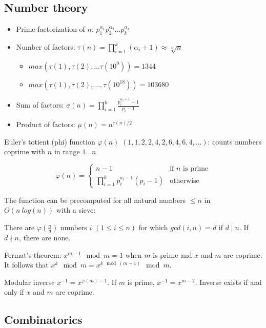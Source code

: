 \documentclass{article}
\newcommand{\divides}{\mid}
\newcommand{\notdivides}{\nmid}
\begin{document}
\subsection {Number theory}

\begin{itemize}
	\item Prime factorization of $n$: $p_1^{\alpha_1}p_2^{\alpha_2} \dots p_k^{\alpha_k}$
	\item Number of factors: $\tau(n) = \prod_{i=1}^{k} (\alpha_i+1) \approx \sqrt[3]n$
		\begin {itemize}
			\item $max(\tau(1), \tau(2), \dots \tau(10^9)) = 1344$
			\item $max(\tau(1), \tau(2), \dots, \tau(10^{18})) = 103680$
		\end {itemize}
	\item Sum of factors: $\sigma(n) = \prod_{i=1}^{k} \frac{p_i^{\alpha_i+1}-1}{p_i-1}$
	\item Product of factors: $\mu(n) = n^{\tau(n)/2}$
\end{itemize}

Euler's totient (phi) function $\varphi(n)$ $(1, 1, 2, 2, 4, 2, 6, 4, 6, 4, \dots)$: counts numbers coprime with $n$ in range $1 \dots n$

\[
	\varphi(n) =
	\begin{cases}
		n-1 &\text{if $n$ is prime} \\
		\prod_{i=1}^{k} p_i^{a_i-1}(p_i-1) &\text{otherwise}
	\end{cases}
\]

The function can be precomputed for all natural numbers $\leq n$ in $O(n\ log(n))$ with a sieve:



There are $\varphi(\frac{n}{d})$ numbers $i$ $(1 \leq i \leq n)$ for which $gcd(i, n) = d$ if $d \divides n$. If $d \notdivides n$, there are none.

Fermat's theorem: $x^{m-1} \mod m = 1$ when $m$ is prime and $x$ and $m$ are coprime. It follows that $x^k \mod m = x^{k \mod (m-1)} \mod m$.

Modular inverse $x^{-1} = x^{\varphi(m)-1}$. If $m$ is prime, $x^{-1} = x^{m-2}$. Inverse exists if and only if $x$ and $m$ are coprime.

\subsection {Combinatorics}
\end{document}

